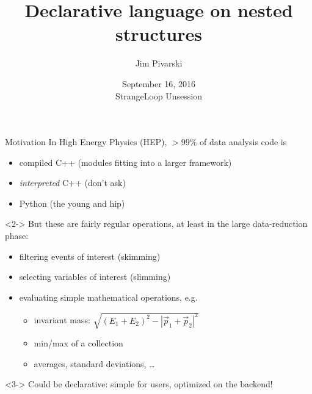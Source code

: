 \documentclass{beamer}
\title[16-09-2016-unsession]{Declarative language on nested structures}
\author{Jim Pivarski}
\institute{Princeton University -- Project DIANA}
\date{September 16, 2016 \\ StrangeLoop Unsession}
\begin{document}

\begin{frame}
  \titlepage
\end{frame}



\begin{frame}{Motivation}
\vspace{0.5 cm}
In High Energy Physics (HEP), $>$99\% of data analysis code is
\begin{itemize}
\item compiled C++ (modules fitting into a larger framework)
\item {\it interpreted} C++ (don't ask)
\item Python (the young and hip)
\end{itemize}

\vspace{0.5 cm}
\begin{uncoverenv}<2->
But these are fairly regular operations, at least in the large data-reduction phase:
\begin{itemize}
\item filtering events of interest (skimming)
\item selecting variables of interest (slimming)
\item evaluating simple mathematical operations, e.g.
\begin{itemize}
\item invariant mass: $\sqrt{(E_1 + E_2)^2 - |\vec{p}_1 + \vec{p}_2|^2}$
\item min/max of a collection
\item averages, standard deviations, \ldots
\end{itemize}
\end{itemize}
\end{uncoverenv}

\vspace{0.5 cm}
\begin{uncoverenv}<3->
Could be declarative: simple for users, optimized on the backend!
\end{uncoverenv}
\end{frame}
\end{document}
